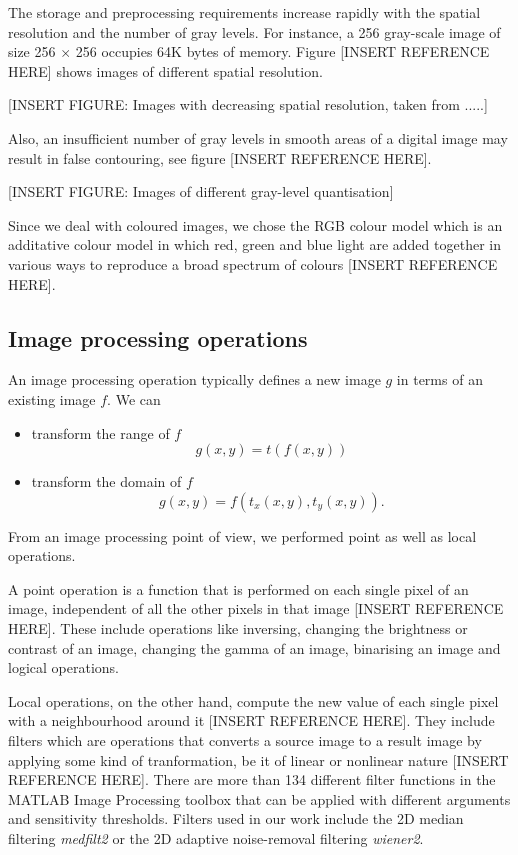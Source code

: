 The storage and preprocessing requirements increase rapidly with the spatial resolution and the number of gray levels. 
For instance, a 256 gray-scale image of size 256 \( \times \) 256 occupies 64K bytes of memory. Figure [INSERT REFERENCE HERE] shows images of different spatial resolution. 

[INSERT FIGURE: Images with decreasing spatial resolution, taken from .....]

Also, an insufficient number of gray levels in smooth areas of a digital image may result in false contouring, see figure [INSERT REFERENCE HERE].

[INSERT FIGURE: Images of different gray-level quantisation]


Since we deal with coloured images, we chose the RGB colour model which is an additative colour model in which red, green and blue light are added together in various ways to reproduce a broad spectrum of colours [INSERT REFERENCE HERE].


\subsection{Image processing operations}

An image processing operation typically defines a new image \( g \) in terms of an existing image \( f \).
We can 
\begin{itemize}
	\item transform the range of \( f \)
	\[ 
	g(x, y) = t(f(x,y)) 
	\]
	\item transform the domain of \( f \)
	\[
	g(x,y) = f(t_{x}(x,y), t_{y}(x,y)).
	\]
\end{itemize}


From an image processing point of view, we performed point as well as local operations.

A point operation is a function that is performed on each single pixel of an image, independent of all the other pixels in that image [INSERT REFERENCE HERE]. These include operations like inversing, changing the brightness or contrast of an image, changing the gamma of an image, binarising an image and logical operations. 

Local operations, on the other hand, compute the new value of each single pixel with a neighbourhood around it [INSERT REFERENCE HERE]. %
They include filters which are operations that converts a source image to a result image by applying some kind of tranformation, be it of linear or nonlinear nature [INSERT REFERENCE HERE]. There are more than 134 different filter functions in the MATLAB Image Processing toolbox that can be applied with different arguments and sensitivity thresholds. Filters used in our work include the 2D median filtering \textit{medfilt2} or the 2D adaptive noise-removal filtering \textit{wiener2}.


